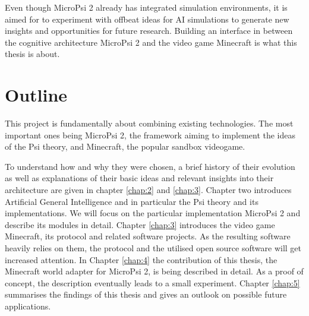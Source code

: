 Even though MicroPsi 2 already has integrated simulation environments, it is aimed for to experiment with offbeat ideas for AI simulations to generate new insights and opportunities for future research. Building an interface in between the cognitive architecture MicroPsi 2 and the video game Minecraft is what this thesis is about.

\section{Outline}
This project is fundamentally about combining existing technologies. The most important ones being MicroPsi 2, the framework aiming to implement the ideas of the Psi theory, and Minecraft, the popular sandbox videogame.

To understand how and why they were chosen, a brief history of their evolution as well as explanations of their basic ideas and relevant insights into their architecture are given in chapter \ref{chap:2} and \ref{chap:3}. Chapter two introduces Artificial General Intelligence and in particular the Psi theory and its implementations. We will focus on the particular implementation MicroPsi 2 and describe its modules in detail. Chapter \ref{chap:3} introduces the video game Minecraft, its protocol and related software projects. As the resulting software heavily relies on them, the protocol and the utilised open source software will get increased attention. 
In Chapter \ref{chap:4} the contribution of this thesis, the Minecraft world adapter for MicroPsi 2, is being described in detail. As a proof of concept, the description eventually leads to a small experiment.
Chapter \ref{chap:5} summarises the findings of this thesis and gives an outlook on possible future applications.